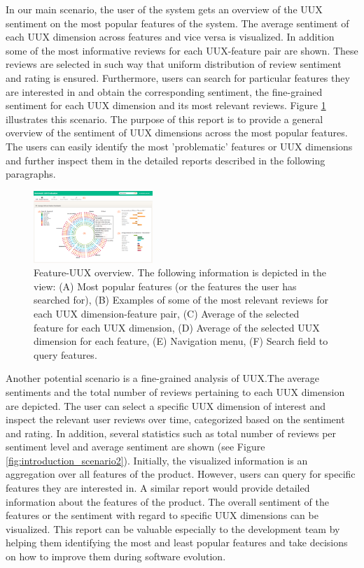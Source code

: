 In our main scenario, the user of the system gets an overview of the UUX sentiment on the most popular features of the system. The average sentiment of each UUX dimension across features and vice versa is visualized. In addition some of the most informative reviews for each UUX-feature pair are shown. These reviews are selected in such way that uniform distribution of review sentiment and rating is ensured.
Furthermore, users can search for particular features they are interested in and obtain the corresponding sentiment, the fine-grained sentiment for each UUX dimension and its most relevant reviews. Figure \ref{fig:introduction_scenario1} illustrates this scenario.
The purpose of this report is to provide a general overview of the sentiment of UUX dimensions across the most popular features. The users can easily identify the most 'problematic' features or UUX dimensions and further inspect them in the detailed reports described in the following paragraphs.


		\begin{figure}[ht]
		\raggedleft
  			\includegraphics[width=0.4\textwidth]{img/introduction_scenario1.png}
			\caption{Feature-UUX overview. The following information is depicted in the view: (A) Most popular features (or the features the user has searched for), (B) Examples of some of the most relevant reviews for each UUX dimension-feature pair, (C) Average of the selected feature for each UUX dimension, (D) Average of the selected UUX dimension for each feature, (E) Navigation menu, (F) Search field to query features.}
			\label{fig:introduction_scenario1}
		\end{figure}

Another potential scenario is a fine-grained analysis of UUX.The average sentiments and the total number of reviews pertaining to each UUX dimension are depicted. The user can select a specific UUX dimension of interest and inspect the relevant user reviews over time, categorized based on the sentiment and rating. In addition, several statistics such as total number of reviews per sentiment level and average sentiment are shown (see Figure \ref{fig:introduction_scenario2}).
Initially, the visualized information is an aggregation over all features of the product. However, users can query for specific features they are interested in. 
A similar report would provide detailed information about the features of the product. The overall sentiment of the features or the sentiment with regard to specific UUX dimensions can be visualized. This report can be valuable especially to the development team by helping them identifying the most and least popular features and take decisions on how to improve them during software evolution.

